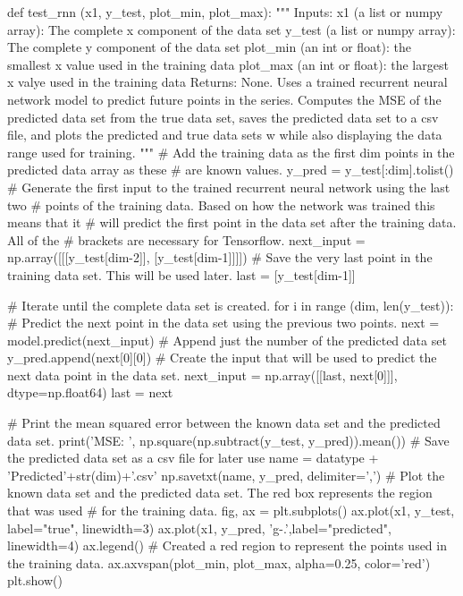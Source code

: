 \documentclass[%
oneside,                 %
final,                   %
10pt]{article}
\begin{document}
\bpycod
def test_rnn (x1, y_test, plot_min, plot_max):
    """
        Inputs:
            x1 (a list or numpy array): The complete x component of the data set
            y_test (a list or numpy array): The complete y component of the data set
            plot_min (an int or float): the smallest x value used in the training data
            plot_max (an int or float): the largest x valye used in the training data
        Returns:
            None.
        Uses a trained recurrent neural network model to predict future points in the 
        series.  Computes the MSE of the predicted data set from the true data set, saves
        the predicted data set to a csv file, and plots the predicted and true data sets w
        while also displaying the data range used for training.
    """
    # Add the training data as the first dim points in the predicted data array as these
    # are known values.
    y_pred = y_test[:dim].tolist()
    # Generate the first input to the trained recurrent neural network using the last two 
    # points of the training data.  Based on how the network was trained this means that it
    # will predict the first point in the data set after the training data.  All of the 
    # brackets are necessary for Tensorflow.
    next_input = np.array([[[y_test[dim-2]], [y_test[dim-1]]]])
    # Save the very last point in the training data set.  This will be used later.
    last = [y_test[dim-1]]

    # Iterate until the complete data set is created.
    for i in range (dim, len(y_test)):
        # Predict the next point in the data set using the previous two points.
        next = model.predict(next_input)
        # Append just the number of the predicted data set
        y_pred.append(next[0][0])
        # Create the input that will be used to predict the next data point in the data set.
        next_input = np.array([[last, next[0]]], dtype=np.float64)
        last = next

    # Print the mean squared error between the known data set and the predicted data set.
    print('MSE: ', np.square(np.subtract(y_test, y_pred)).mean())
    # Save the predicted data set as a csv file for later use
    name = datatype + 'Predicted'+str(dim)+'.csv'
    np.savetxt(name, y_pred, delimiter=',')
    # Plot the known data set and the predicted data set.  The red box represents the region that was used
    # for the training data.
    fig, ax = plt.subplots()
    ax.plot(x1, y_test, label="true", linewidth=3)
    ax.plot(x1, y_pred, 'g-.',label="predicted", linewidth=4)
    ax.legend()
    # Created a red region to represent the points used in the training data.
    ax.axvspan(plot_min, plot_max, alpha=0.25, color='red')
    plt.show()
\end{document}
